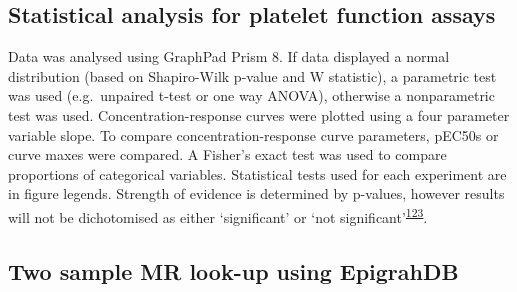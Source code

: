 \documentclass[11pt,twoside]{bristolthesis}
\begin{document}
\hypertarget{statistical-analysis-for-platelet-function-assays-1}{%
\subsection{Statistical analysis for platelet function assays}\label{statistical-analysis-for-platelet-function-assays-1}}

Data was analysed using GraphPad Prism 8. If data displayed a normal distribution (based on Shapiro-Wilk p-value and W statistic), a parametric test was used (e.g.~unpaired t-test or one way ANOVA), otherwise a nonparametric test was used. Concentration-response curves were plotted using a four parameter variable slope. To compare concentration-response curve parameters, pEC50s or curve maxes were compared. A Fisher's exact test was used to compare proportions of categorical variables. Statistical tests used for each experiment are in figure legends. Strength of evidence is determined by p-values, however results will not be dichotomised as either `significant' or `not significant'\textsuperscript{\protect\hyperlink{ref-Sterne2001}{123}}.

\hypertarget{two-sample-mr-look-up-using-epigrahdb}{%
\subsection{Two sample MR look-up using EpigrahDB}\label{two-sample-mr-look-up-using-epigrahdb}}
\end{document}
